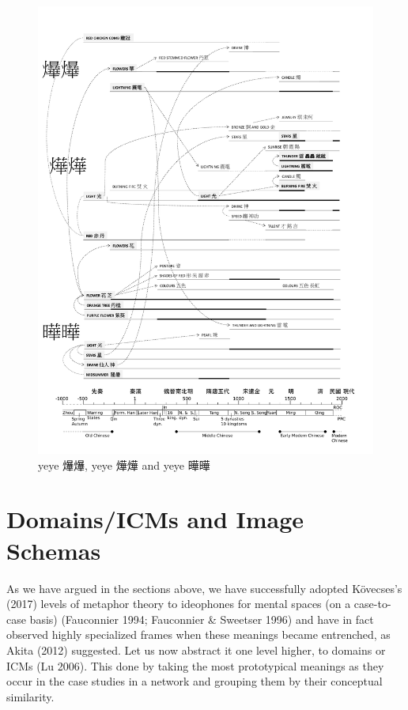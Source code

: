 \documentclass[12pt,article,oneside]{memoir}
\theoremstyle{definition}
\theoremstyle{definition}
\theoremstyle{definition}
\theoremstyle{remark}
\begin{document}
\begin{figure}
\centering
\includegraphics{ideos/yeye.pdf}
\caption{\label{fig:yeye}yeye 爗爗, yeye 燁燁 and yeye 曄曄}
\end{figure}

\section{Domains/ICMs and Image
Schemas}\label{domainsicms-and-image-schemas}

As we have argued in the sections above, we have successfully adopted
Kövecses's (2017) levels of metaphor theory to ideophones for mental
spaces (on a case-to-case basis) (Fauconnier 1994; Fauconnier \&
Sweetser 1996) and have in fact observed highly specialized frames when
these meanings became entrenched, as Akita (2012) suggested. Let us now
abstract it one level higher, to domains or ICMs (Lu 2006). This done by
taking the most prototypical meanings as they occur in the case studies
in a network and grouping them by their conceptual similarity.
\end{document}
